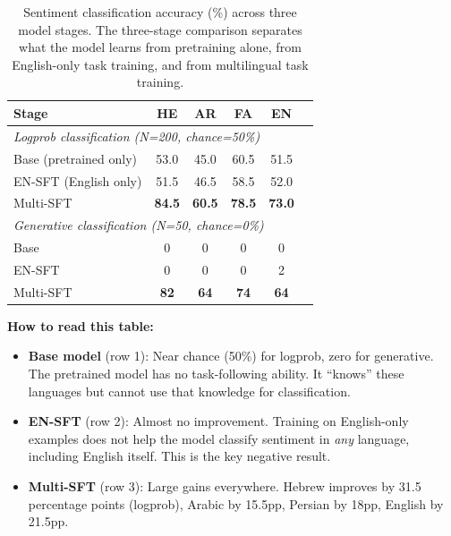 \documentclass[11pt,a4paper]{article}
\begin{document}
\begin{table}[H]
\centering
\begin{tabular}{lccccc}
\toprule
\textbf{Stage} & \textbf{HE} & \textbf{AR} & \textbf{FA} & \textbf{EN} \\
\midrule
\multicolumn{5}{l}{\textit{Logprob classification (N=200, chance=50\%)}} \\
Base (pretrained only) & 53.0 & 45.0 & 60.5 & 51.5 \\
EN-SFT (English only) & 51.5 & 46.5 & 58.5 & 52.0 \\
Multi-SFT & \textbf{84.5} & \textbf{60.5} & \textbf{78.5} & \textbf{73.0} \\
\midrule
\multicolumn{5}{l}{\textit{Generative classification (N=50, chance=0\%)}} \\
Base & 0 & 0 & 0 & 0 \\
EN-SFT & 0 & 0 & 0 & 2 \\
Multi-SFT & \textbf{82} & \textbf{64} & \textbf{74} & \textbf{64} \\
\bottomrule
\end{tabular}
\caption{Sentiment classification accuracy (\%) across three model stages. The three-stage comparison separates what the model learns from pretraining alone, from English-only task training, and from multilingual task training.}
\label{tab:results_sentiment}
\end{table}

\textbf{How to read this table:}

\begin{itemize}
    \item \textbf{Base model} (row 1): Near chance (50\%) for logprob, zero for generative. The pretrained model has no task-following ability. It ``knows'' these languages but cannot use that knowledge for classification.
    
    \item \textbf{EN-SFT} (row 2): Almost no improvement. Training on English-only examples does not help the model classify sentiment in \emph{any} language, including English itself. This is the key negative result.
    
    \item \textbf{Multi-SFT} (row 3): Large gains everywhere. Hebrew improves by 31.5 percentage points (logprob), Arabic by 15.5pp, Persian by 18pp, English by 21.5pp.
\end{itemize}
\end{document}
